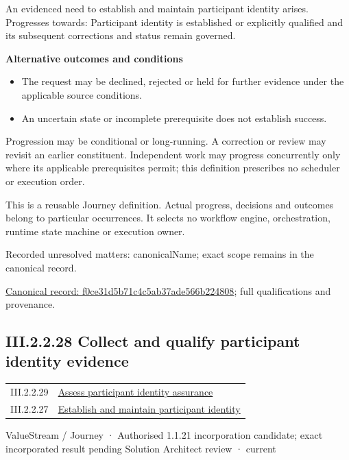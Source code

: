 An evidenced need to establish and maintain participant identity arises. Progresses towards: Participant identity is established or explicitly qualified and its subsequent corrections and status remain governed.



\par\medskip\textbf{Alternative outcomes and conditions}\par


\begin{itemize}


\item The request may be declined, rejected or held for further evidence under the applicable source conditions.

\item An uncertain state or incomplete prerequisite does not establish success.

\end{itemize}


Progression may be conditional or long-running. A correction or review may revisit an earlier constituent. Independent work may progress concurrently only where its applicable prerequisites permit; this definition prescribes no scheduler or execution order.



This is a reusable Journey definition. Actual progress, decisions and outcomes belong to particular occurrences. It selects no workflow engine, orchestration, runtime state machine or execution owner.


{\small Recorded unresolved matters: canonicalName; exact scope remains in the canonical record.}\par
{\footnotesize \href{../../../../continuum/strategy/value-stream/f0ce31d5b71c4c5ab37ade566b224808.md}{Canonical record: f0ce31d5b71c4c5ab37ade566b224808}; full qualifications and provenance.}\par
\subsection*{III.2.2.28 Collect and qualify participant identity evidence}
\label{navigation:III.2.2.28}

\begin{longtable}{p{.22\linewidth}p{.73\linewidth}}
III.2.2.29 & \hyperref[element:215676da8a3040bba2fa02574a4c3443]{Assess participant identity assurance} \\
III.2.2.27 & \hyperref[element:f0ce31d5b71c4c5ab37ade566b224808]{Establish and maintain participant identity} \\
\end{longtable}
\label{element:d3db9d9c27394b99bab78a34b395316a}
{\small ValueStream / Journey · Authorised 1.1.21 incorporation candidate; exact incorporated result pending Solution Architect review · current}\par

